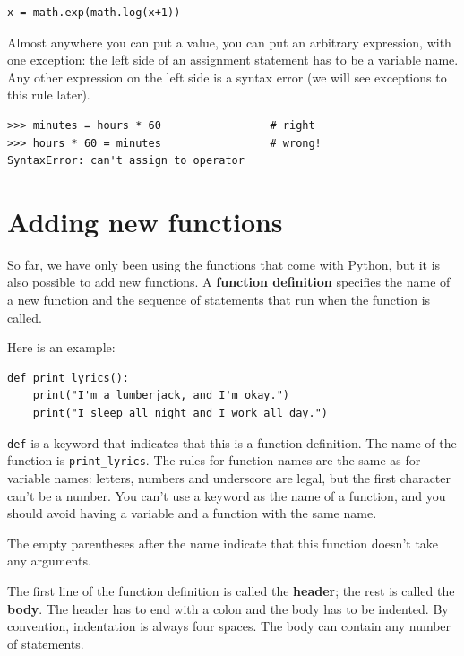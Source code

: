 \documentclass[10pt]{book}
\begin{document}
\begin{verbatim}
x = math.exp(math.log(x+1))
\end{verbatim}
%
Almost anywhere you can put a value, you can put an arbitrary
expression, with one exception: the left side of an assignment
statement has to be a variable name.  Any other expression on the left
side is a syntax error (we will see exceptions to this rule
later).

\begin{verbatim}
>>> minutes = hours * 60                 # right
>>> hours * 60 = minutes                 # wrong!
SyntaxError: can't assign to operator
\end{verbatim}
%


\section{Adding new functions}

So far, we have only been using the functions that come with Python,
but it is also possible to add new functions.
A {\bf function definition} specifies the name of a new function and
the sequence of statements that run when the function is called.

Here is an example:

\begin{verbatim}
def print_lyrics():
    print("I'm a lumberjack, and I'm okay.")
    print("I sleep all night and I work all day.")
\end{verbatim}
%
{\tt def} is a keyword that indicates that this is a function
definition.  The name of the function is \verb"print_lyrics".  The
rules for function names are the same as for variable names: letters,
numbers and underscore are legal, but the first character
can't be a number.  You can't use a keyword as the name of a function,
and you should avoid having a variable and a function with the same
name.

The empty parentheses after the name indicate that this function
doesn't take any arguments.

The first line of the function definition is called the {\bf header};
the rest is called the {\bf body}.  The header has to end with a colon
and the body has to be indented.  By convention, indentation is
always four spaces.  The body can contain
any number of statements.
\end{document}
